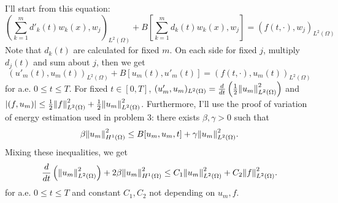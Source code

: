 \documentclass{article}
\begin{document}
\begin{enumerate}
I'll start from this equation:
\begin{equation*}
(\sum\limits_{k=1}^m d'_k(t)w_k(x),w_j)_{L^2(\Omega)}+B[\sum\limits_{k=1}^m d_k(t)w_k(x), w_j]=(f(t,\cdot), w_j)_{L^2(\Omega)}
\end{equation*}
Note that $d_k(t)$ are calculated for fixed $m$. On each side for fixed $j$, multiply $d_j(t)$ and sum about $j$, then we get
\begin{equation*}
(u'_m(t),u_m(t))_{L^2(\Omega)}+B[u_m(t), u'_m(t)]=(f(t,\cdot), u_m(t))_{L^2(\Omega)}
\end{equation*}
for a.e. $0\leq t\leq T$. For fixed $t\in [0,T]$, $(u'_m,u_m)_{L^2(\Omega)}=\frac{d}{dt}\left(\frac{1}{2}\norm{u_m}^2_{L^2(\Omega)}\right)$ and $\abs{(f,u_m)}\leq \frac{1}{2}\norm{f}^2_{L^2(\Omega)}+\frac{1}{2}\norm{u_m}^2_{L^2(\Omega)}$. Furthermore, I'll use the proof of variation of energy estimation used in problem 3: there exists $\beta,\gamma>0$ such that
\begin{equation*}
\beta\norm{u_m}^2_{H^1(\Omega)}\leq B[u_m, u_m, t]+\gamma \norm{u_m}^2_{L^2(\Omega)}.
\end{equation*}
Mixing these inequalities, we get
\begin{equation}\label{Eq:6-1}
\frac{d}{dt}\left(\norm{u_m}^2_{L^2(\Omega)}\right)+2\beta\norm{u_m}^2_{H^1(\Omega)}\leq C_1\norm{u_m}^2_{L^2(\Omega)}+C_2\norm{f}^2_{L^2(\Omega)}.
\end{equation}
for a.e. $0\leq t\leq T$ and constant $C_1,C_2$ not depending on $u_m, f$.


\end{enumerate}
\end{document}

